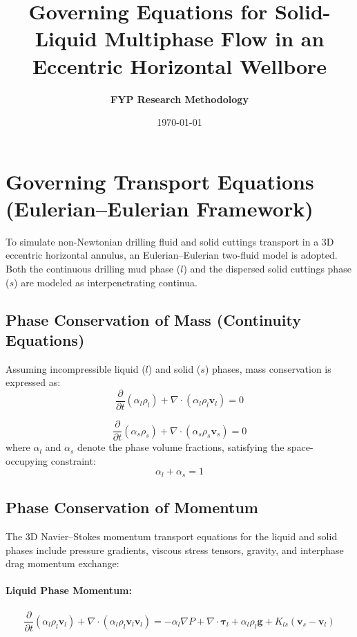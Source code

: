 \documentclass[12pt,a4paper]{article}
\title{\textbf{Governing Equations for Solid-Liquid Multiphase Flow in an Eccentric Horizontal Wellbore}}
\author{\textbf{FYP Research Methodology}}
\date{\today}
\begin{document}
\maketitle

\section{Governing Transport Equations (Eulerian--Eulerian Framework)}
To simulate non-Newtonian drilling fluid and solid cuttings transport in a 3D eccentric horizontal annulus, an Eulerian--Eulerian two-fluid model is adopted. Both the continuous drilling mud phase ($l$) and the dispersed solid cuttings phase ($s$) are modeled as interpenetrating continua.

\subsection{Phase Conservation of Mass (Continuity Equations)}
Assuming incompressible liquid ($l$) and solid ($s$) phases, mass conservation is expressed as:
\begin{equation}
\frac{\partial}{\partial t} (\alpha_l \rho_l) + \nabla \cdot (\alpha_l \rho_l \mathbf{v}_l) = 0
\end{equation}

\begin{equation}
\frac{\partial}{\partial t} (\alpha_s \rho_s) + \nabla \cdot (\alpha_s \rho_s \mathbf{v}_s) = 0
\end{equation}
where $\alpha_l$ and $\alpha_s$ denote the phase volume fractions, satisfying the space-occupying constraint:
\begin{equation}
\alpha_l + \alpha_s = 1
\end{equation}

\subsection{Phase Conservation of Momentum}
The 3D Navier--Stokes momentum transport equations for the liquid and solid phases include pressure gradients, viscous stress tensors, gravity, and interphase drag momentum exchange:

\paragraph{Liquid Phase Momentum:}
\begin{equation}
\frac{\partial}{\partial t}(\alpha_l \rho_l \mathbf{v}_l) + \nabla \cdot (\alpha_l \rho_l \mathbf{v}_l \mathbf{v}_l) = -\alpha_l \nabla P + \nabla \cdot \boldsymbol{\tau}_l + \alpha_l \rho_l \mathbf{g} + K_{ls}(\mathbf{v}_s - \mathbf{v}_l)
\end{equation}
\end{document}
